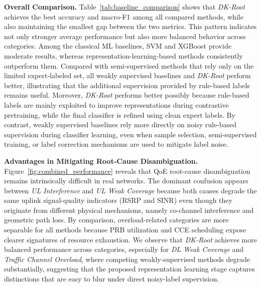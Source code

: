 \documentclass[lettersize,journal]{IEEEtran}
\begin{document}
\noindent\textbf{Overall Comparison.} Table~\ref{tab:baseline_comparison} shows that \textit{DK-Root} achieves the best accuracy and macro-F1 among all compared methods, while also maintaining the smallest gap between the two metrics. This pattern indicates not only stronger average performance but also more balanced behavior across categories. Among the classical ML baselines, SVM and XGBoost provide moderate results, whereas representation-learning-based methods consistently outperform them. {\color{R3color}Compared with semi-supervised methods that rely only on the limited expert-labeled set, all weakly supervised baselines and \textit{DK-Root} perform better, illustrating that the additional supervision provided by rule-based labels remains useful. Moreover, \textit{DK-Root} performs better possibly because rule-based labels are mainly exploited to improve representations during contrastive pretraining, while the final classifier is refined using clean expert labels. By contrast, weakly supervised baselines rely more directly on noisy rule-based supervision during classifier learning, even when sample selection, semi-supervised training, or label correction mechanisms are used to mitigate label noise.}


{\color{AEcolor}
{\color{R2color}\noindent\textbf{Advantages in Mitigating Root-Cause Disambiguation.}
Figure~\ref{fig:combined_performance} reveals that QoE root-cause disambiguation remains intrinsically difficult in real networks. The dominant confusion appears between \textit{UL Interference} and \textit{UL Weak Coverage} because both causes degrade the same uplink signal-quality indicators (RSRP and SINR) even though they originate from different physical mechanisms, namely co-channel interference and geometric path loss. By comparison, overload-related categories are more separable for all methods because PRB utilization and CCE scheduling expose clearer signatures of resource exhaustion. 
We observe that \textit{DK-Root} achieves more balanced performance across categories, especially for \textit{DL Weak Coverage} and \textit{Traffic Channel Overload}, where competing weakly-supervised methods degrade substantially, suggesting that the proposed representation learning stage captures distinctions that are easy to blur under direct noisy-label supervision.}
}
\end{document}

